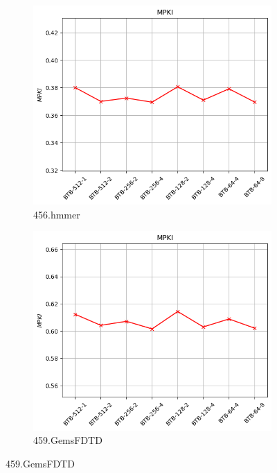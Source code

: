 \documentclass{article}
\begin{document}
\begin{figure}[H]
    \centering
    \ContinuedFloat

    \begin{subfigure}[b]{0.45\textwidth}
        \includegraphics[width=\textwidth]{figures/5_4/456.hmmer.cslab_branch_preds_ref.out.png}
        \caption{456.hmmer}
        \label{fig:plot59}
    \end{subfigure}
    \hfill
    \begin{subfigure}[b]{0.45\textwidth}
        \includegraphics[width=\textwidth]{figures/5_4/459.GemsFDTD.cslab_branch_preds_ref.out.png}
        \caption{459.GemsFDTD}
        \label{fig:plot60}
    \end{subfigure}


\end{figure}
\end{document}
